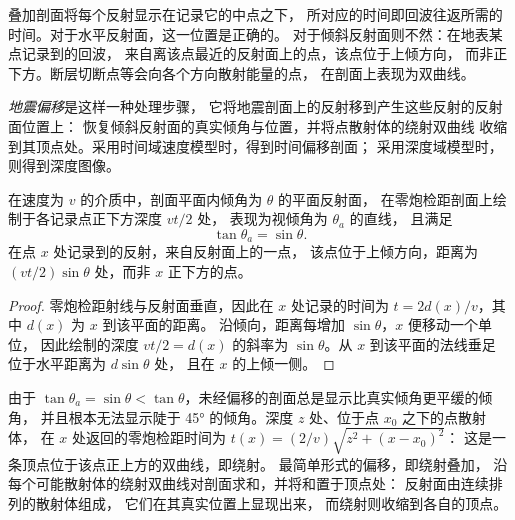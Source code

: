 叠加剖面将每个反射显示在记录它的中点之下，
所对应的时间即回波往返所需的时间。对于水平反射面，这一位置是正确的。
对于倾斜反射面则不然：在地表某点记录到的回波，
来自离该点最近的反射面上的点，该点位于上倾方向，
而非正下方。断层切断点等会向各个方向散射能量的点，
在剖面上表现为双曲线。

\begin{definition}[地震偏移]\label{def:b3:exploration-seismology:migration}
\emph{地震偏移}是这样一种处理步骤，
它将地震剖面上的反射移到产生这些反射的反射面位置上：
恢复倾斜反射面的真实倾角与位置，并将点散射体的绕射双曲线
收缩到其顶点处。采用时间域速度模型时，得到时间偏移剖面；
采用深度域模型时，
则得到深度图像。
\end{definition}

\begin{theorem}[零炮检距剖面上的倾角]\label{thm:b3:exploration-seismology:dip}
在速度为 $v$ 的介质中，剖面平面内倾角为 $\theta$ 的平面反射面，
在零炮检距剖面上绘制于各记录点正下方深度 $vt/2$ 处，
表现为视倾角为 $\theta_a$ 的直线，
且满足
\[
  \tan\theta_a = \sin\theta .
\]
在点 $x$ 处记录到的反射，来自反射面上的一点，
该点位于上倾方向，距离为 $(vt/2)\sin\theta$ 处，而非 $x$ 正下方的点。
\end{theorem}

\begin{proof}
零炮检距射线与反射面垂直，因此在 $x$ 处记录的时间为
$t = 2d(x)/v$，其中 $d(x)$ 为 $x$ 到该平面的距离。
沿倾向，距离每增加 $\sin\theta$，$x$ 便移动一个单位，
因此绘制的深度 $vt/2 = d(x)$ 的斜率为 $\sin\theta$。从 $x$ 到该平面的法线垂足
位于水平距离为 $d\sin\theta$ 处，
且在 $x$ 的上倾一侧。
\end{proof}

由于 $\tan\theta_a = \sin\theta < \tan\theta$，未经偏移的剖面总是显示比真实倾角更平缓的倾角，
并且根本无法显示陡于 \ang{45} 的倾角。深度 $z$ 处、位于点 $x_0$ 之下的点散射体，
在 $x$ 处返回的零炮检距时间为 $t(x) = (2/v)\sqrt{z^2 + (x - x_0)^2}$：
这是一条顶点位于该点正上方的双曲线，即绕射。
最简单形式的偏移，即绕射叠加，
沿每个可能散射体的绕射双曲线对剖面求和，并将和置于顶点处：
反射面由连续排列的散射体组成，
它们在其真实位置上显现出来，
而绕射则收缩到各自的顶点。

